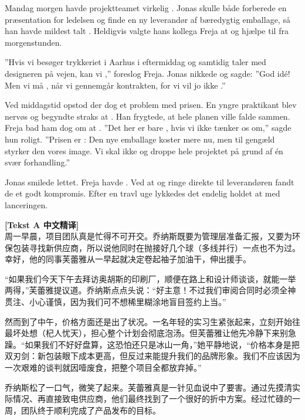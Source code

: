 Mandag morgen havde projektteamet virkelig . Jonas skulle både forberede en præsentation for ledelsen og finde en ny leverandør af bæredygtig emballage, så han havde mildest talt . Heldigvis valgte hans kollega Freja at  og hjælpe til fra morgenstunden.

”Hvis vi besøger trykkeriet i Aarhus i eftermiddag og samtidig taler med designeren på vejen, kan vi ,” foreslog Freja. Jonas nikkede og sagde: ”God idé! Men vi må , når vi gennemgår kontrakten, for vi vil jo ikke .”

Ved middagstid opstod der dog et problem med prisen. En yngre praktikant blev nervøs og begyndte straks at . Han frygtede, at hele planen ville falde sammen. Freja bad ham dog om at . ”Det her er bare , hvis vi ikke tænker os om,” sagde hun roligt. ”Prisen er : Den nye emballage koster mere nu, men til gengæld styrker den vores image. Vi skal ikke  og droppe hele projektet på grund af én svær forhandling.”

Jonas smilede lettet. Freja havde . Ved at  og ringe direkte til leverandøren fandt de et godt kompromis. Efter en travl uge lykkedes det endelig holdet at  med lanceringen.

\begin{transbox}
\small
\textbf{\color{NCDTeal}[Tekst A 中文精译]}\\
周一早晨，项目团队真是忙得不可开交。乔纳斯既要为管理层准备汇报，又要为环保包装寻找新供应商，所以说他同时在抛接好几个球（多线并行）一点也不为过。幸好，他的同事芙蕾雅从一早起就决定卷起袖子加油干，伸出援手。

“如果我们今天下午去拜访奥胡斯的印刷厂，顺便在路上和设计师谈谈，就能一举两得，”芙蕾雅提议道。乔纳斯点点头说：“好主意！不过我们审阅合同时必须全神贯注、小心谨慎，因为我们可不想稀里糊涂地盲目签约上当。”

然而到了中午，价格方面还是出了状况。一名年轻的实习生紧张起来，立刻开始往最坏处想（杞人忧天），担心整个计划会彻底泡汤。但芙蕾雅让他先冷静下来别急躁。“如果我们不好好盘算，这恐怕还只是冰山一角，”她平静地说，“价格本身是把双刃剑：新包装眼下成本更高，但反过来能提升我们的品牌形象。我们不应该因为一次艰难的谈判就因噎废食，把整个项目全都放弃掉。”

乔纳斯松了一口气，微笑了起来。芙蕾雅真是一针见血说中了要害。通过先摸清实际情况、再直接致电供应商，他们最终找到了一个很好的折中方案。经过忙碌的一周，团队终于顺利完成了产品发布的目标。
\end{transbox}

